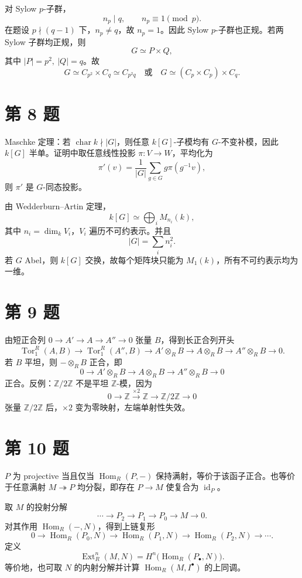 \documentclass[11pt]{article}
\begin{document}
对 Sylow \(p\)-子群，
\[
  n_p\mid q,\qquad n_p\equiv1\pmod p.
\]
在题设 \(p\nmid(q-1)\) 下，\(n_p\neq q\)，故 \(n_p=1\)。因此 Sylow \(p\)-子群也正规。若两 Sylow 子群均正规，则
\[
  G\simeq P\times Q,
\]
其中 \(|P|=p^2,\ |Q|=q\)。故
\[
  G\simeq C_{p^2}\times C_q\simeq C_{p^2q}
  \quad\text{或}\quad
  G\simeq (C_p\times C_p)\times C_q.
\]

\section*{第 8 题}

Maschke 定理：若 \(\operatorname{char}k\nmid |G|\)，则任意 \(k[G]\)-子模均有 \(G\)-不变补模，因此 \(k[G]\) 半单。证明中取任意线性投影 \(\pi:V\to W\)，平均化为
\[
  \pi'(v)=\frac1{|G|}\sum_{g\in G}g\pi(g^{-1}v),
\]
则 \(\pi'\) 是 \(G\)-同态投影。

由 Wedderburn--Artin 定理，
\[
  k[G]\simeq \bigoplus_i M_{n_i}(k),
\]
其中 \(n_i=\dim_k V_i\)，\(V_i\) 遍历不可约表示。并且
\[
  |G|=\sum_i n_i^2.
\]
若 \(G\) Abel，则 \(k[G]\) 交换，故每个矩阵块只能为 \(M_1(k)\)，所有不可约表示均为一维。

\section*{第 9 题}

由短正合列 \(0\to A'\to A\to A''\to0\) 张量 \(B\)，得到长正合列开头
\[
  \operatorname{Tor}_1^R(A,B)\to
  \operatorname{Tor}_1^R(A'',B)\to
  A'\otimes_R B\to A\otimes_R B\to A''\otimes_R B\to0.
\]
若 \(B\) 平坦，则 \(-\otimes_R B\) 正合，即
\[
  0\to A'\otimes_R B\to A\otimes_R B\to A''\otimes_R B\to0
\]
正合。反例：\(\mathbb Z/2\mathbb Z\) 不是平坦 \(\mathbb Z\)-模，因为
\[
  0\to \mathbb Z\xrightarrow{\times2}\mathbb Z\to \mathbb Z/2\mathbb Z\to0
\]
张量 \(\mathbb Z/2\mathbb Z\) 后，\(\times2\) 变为零映射，左端单射性失效。

\section*{第 10 题}

\(P\) 为 projective 当且仅当 \(\operatorname{Hom}_R(P,-)\) 保持满射，等价于该函子正合。也等价于任意满射 \(M\twoheadrightarrow P\) 均分裂，即存在 \(P\to M\) 使复合为 \(\operatorname{id}_P\)。

取 \(M\) 的投射分解
\[
  \cdots\to P_2\to P_1\to P_0\to M\to0.
\]
对其作用 \(\operatorname{Hom}_R(-,N)\)，得到上链复形
\[
  0\to \operatorname{Hom}_R(P_0,N)\to \operatorname{Hom}_R(P_1,N)\to\operatorname{Hom}_R(P_2,N)\to\cdots.
\]
定义
\[
  \operatorname{Ext}_R^n(M,N)
  =H^n\bigl(\operatorname{Hom}_R(P_\bullet,N)\bigr).
\]
等价地，也可取 \(N\) 的内射分解并计算 \(\operatorname{Hom}_R(M,I^\bullet)\) 的上同调。
\end{document}
